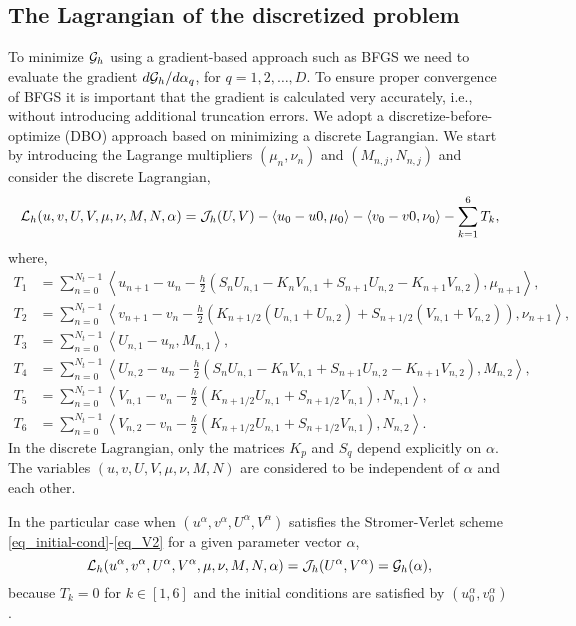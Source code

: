 \documentclass[11pt]{article}
\begin{document}
\subsection{The Lagrangian of the discretized problem}
To minimize ${\cal G}_h$ using a gradient-based approach such as BFGS we need to evaluate the gradient
$d {\cal G}_h/ d\alpha_q$, for $q=1,2,\ldots,D$. To ensure proper convergence of BFGS it is important that the
gradient is calculated very accurately, i.e., without introducing additional truncation errors. We
adopt a discretize-before-optimize (DBO) approach based on minimizing a discrete Lagrangian. We start by
introducing the Lagrange multipliers $(\mu_n,\nu_n)$ and $(M_{n,j}, N_{n,j})$ and consider the discrete Lagrangian,
\begin{equation}
{\cal L}_h(u,v,U,V, \mu,\nu,M,N,\alpha) = {\cal J}_h(U,V) - \langle u_0 - u0, \mu_0\rangle - \langle
v_0 - v0, \nu_0\rangle - \sum_{k=1}^6 T_k,
\end{equation}
where,
\begin{align}
T_1 &= \sum_{n=0}^{N_t-1} \left\langle u_{n+1} - u_n - \frac{h}{2}\left(S_nU_{n,1} - K_nV_{n,1} + S_{n+1}U_{n,2} - K_{n+1}V_{n,2}
  \right), \mu_{n+1} \right\rangle,\\
T_2 &= \sum_{n=0}^{N_t-1} \left\langle v_{n+1} - v_n - \frac{h}{2}\left(K_{n+1/2} \left(U_{n,1} + U_{n,2}\right) + S_{n+1/2}\left(
  V_{n,1} +  V_{n,2}\right) \right), \nu_{n+1} \right\rangle,\\
T_3 &= \sum_{n=0}^{N_t-1} \left\langle U_{n,1} - u_n, M_{n,1} \right\rangle,\\
T_4 &= \sum_{n=0}^{N_t-1} \left\langle U_{n,2} - u_n - \frac{h}{2}\left(S_nU_{n,1} - K_nV_{n,1} + S_{n+1}U_{n,2} -
  K_{n+1}V_{n,2} \right), M_{n,2} \right\rangle,\\
T_5 &= \sum_{n=0}^{N_t-1} \left\langle V_{n,1} - v_n - \frac{h}{2}\left(  K_{n+1/2} U_{n,1} + S_{n+1/2} V_{n,1} \right), N_{n,1} \right\rangle,\\
T_6 &= \sum_{n=0}^{N_t-1} \left\langle V_{n,2} - v_n - \frac{h}{2}\left(  K_{n+1/2} U_{n,1} + S_{n+1/2} V_{n,1} \right), N_{n,2} \right\rangle.
\end{align}
In the discrete Lagrangian, only the matrices $K_p$ and $S_q$ depend explicitly on $\alpha$. The
variables $(u,v,U,V, \mu,\nu,M,N)$ are considered to be independent of $\alpha$ and each
other.

In the particular case when $(u^\alpha,v^\alpha,U^\alpha,V^\alpha)$ satisfies the Stromer-Verlet scheme
\eqref{eq_initial-cond}-\eqref{eq_V2} for a given parameter vector $\alpha$,
\[
{\cal L}_h(u^\alpha,v^\alpha,U^\alpha,V^\alpha, \mu,\nu,M,N,\alpha) = {\cal J}_h(U^\alpha, V^\alpha) = {\cal G}_h(\alpha),
\]
because $T_k=0$ for $k\in[1,6]$ and the initial conditions are satisfied by $(u^\alpha_0, v^\alpha_0)$.
\end{document}
